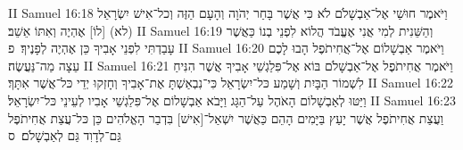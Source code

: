 II Samuel 16:18	וַיֹּאמֶר חוּשַׁי אֶל־אַבְשָׁלֹם לֹא כִּי אֲשֶׁר בָּחַר יְהֹוָה וְהָעָם הַזֶּה וְכל־אִישׁ יִשְׂרָאֵל (לא) [לוֹ] אֶהְיֶה וְאִתּוֹ אֵשֵׁב׃
II Samuel 16:19	וְהַשֵּׁנִית לְמִי אֲנִי אֶעֱבֹד הֲלוֹא לִפְנֵי בְנוֹ כַּאֲשֶׁר עָבַדְתִּי לִפְנֵי אָבִיךָ כֵּן אֶהְיֶה לְפָנֶיךָ׃ {פ}
II Samuel 16:20	וַיֹּאמֶר אַבְשָׁלוֹם אֶל־אֲחִיתֹפֶל הָבוּ לָכֶם עֵצָה מַה־נַּעֲשֶׂה׃
II Samuel 16:21	וַיֹּאמֶר אֲחִיתֹפֶל אֶל־אַבְשָׁלֹם בּוֹא אֶל־פִּלַגְשֵׁי אָבִיךָ אֲשֶׁר הִנִּיחַ לִשְׁמוֹר הַבָּיִת וְשָׁמַע כּל־יִשְׂרָאֵל כִּי־נִבְאַשְׁתָּ אֶת־אָבִיךָ וְחָזְקוּ יְדֵי כּל־אֲשֶׁר אִתָּךְ׃
II Samuel 16:22	וַיַּטּוּ לְאַבְשָׁלוֹם הָאֹהֶל עַל־הַגָּג וַיָּבֹא אַבְשָׁלוֹם אֶל־פִּלַגְשֵׁי אָבִיו לְעֵינֵי כּל־יִשְׂרָאֵל׃
II Samuel 16:23	וַעֲצַת אֲחִיתֹפֶל אֲשֶׁר יָעַץ בַּיָּמִים הָהֵם כַּאֲשֶׁר יִשְׁאַל־[אִישׁ] בִּדְבַר הָאֱלֹהִים כֵּן כּל־עֲצַת אֲחִיתֹפֶל גַּם־לְדָוִד גַּם לְאַבְשָׁלֹם׃ {ס}        
